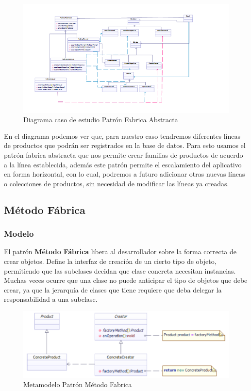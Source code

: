 	\begin{figure}[th!]
		\centering
		\includegraphics[width=1\linewidth]{arquitectura/imagenes/DiagramaFabricaAbstracta}
		\caption{Diagrama caso de estudio Patrón Fabrica Abstracta}
	\end{figure}
	
	
	
	En el diagrama podemos ver que, para nuestro caso tendremos diferentes líneas de productos que podrán ser registrados en la base de datos. Para esto usamos el patrón fabrica abstracta que nos permite crear familias de productos de acuerdo a la línea establecida, además este patrón permite el escalamiento del aplicativo en forma horizontal, con lo cual, podremos a futuro adicionar otras nuevas líneas o colecciones de productos, sin necesidad de modificar las líneas ya creadas.
	
	


\subsection{Método Fábrica}
\subsubsection{Modelo}
El patrón \textbf{Método Fábrica} libera al desarrollador sobre la forma correcta de crear objetos. Define la interfaz de creación de un cierto tipo de objeto, permitiendo que las subclases decidan que clase concreta necesitan instancias. Muchas veces ocurre que una clase no puede anticipar el tipo de objetos que debe crear, ya que la jerarquía de clases que tiene requiere que deba delegar la responsabilidad a una subclase. 

\begin{figure}[th!]
	\centering
	\includegraphics[width=1.0\linewidth]{arquitectura/imagenes/modeloMetFab}
	\caption{Metamodelo Patrón Método Fabrica}
	\label{fig:metamodelo metodo fabrica}
\end{figure}


